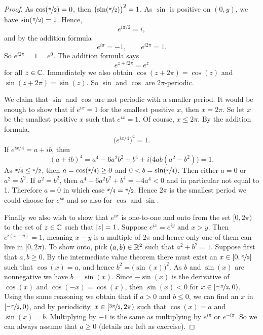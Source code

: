 \begin{proof}
As $\cos(\nicefrac{\pi}{2}) = 0$, then
${\bigl(\sin(\nicefrac{\pi}{2})\bigr)}^2 = 1$.
As $\sin$ is positive on $(0,y)$, we have
$\sin(\nicefrac{\pi}{2}) = 1$.
Hence,
\begin{equation*}
e^{i \pi /2} = i ,
\end{equation*}
and by the addition formula 
\begin{equation*}
e^{i \pi} = -1 ,
\qquad 
e^{i 2\pi} = 1 .
\end{equation*}
So $e^{i2\pi} = 1 = e^0$.  The addition formula says
\begin{equation*}
e^{z+i2\pi} = e^z
\end{equation*}
for all $z \in {\mathbb{C}}$.  Immediately we also obtain
$\cos(z+2\pi) = \cos(z)$ and $\sin(z+2\pi) = \sin(z)$.
So $\sin$ and $\cos$ are $2\pi$-periodic.

We claim that $\sin$ and $\cos$ are not periodic with a smaller period.  It
would be enough to show that if $e^{ix} = 1$ for the
smallest positive $x$, then
$x = 2\pi$.  So let $x$ be the smallest positive $x$ such that
$e^{ix} = 1$.
Of course, $x \leq 2\pi$.
By the addition formula,
\begin{equation*}
{\bigl(e^{ix/4}\bigr)}^4 = 1 .
\end{equation*}
If $e^{ix/4} = a+ib$, then
\begin{equation*}
{(a+ib)}^4
=a^4-6a^2b^2+b^4 + i\bigl(4ab(a^2-b^2)\bigr)
=1 .
\end{equation*}
As $\nicefrac{x}{4} \leq \nicefrac{\pi}{2}$, then $a = \cos(\nicefrac{x}{4}) \geq 0$ and
$0 < b = \sin(\nicefrac{x}{4})$.  Then either $a = 0$ 
or $a^2 = b^2$.  If $a^2=b^2$, then
$a^4-6a^2b^2+b^4 = -4a^4 < 0$ and in particular not equal to 1.
Therefore $a=0$ in which case $\nicefrac{x}{4} = \nicefrac{\pi}{2}$.
Hence $2\pi$ is the smallest period we could choose for $e^{ix}$
and so also for $\cos$ and $\sin$.

Finally we also wish to show that $e^{ix}$ is one-to-one and onto
from the set $[0,2\pi)$ to the set of $z \in {\mathbb{C}}$ such that
$\lvert {z} \rvert = 1$.  Suppose $e^{ix} = e^{iy}$ and 
$x > y$.  Then
$e^{i(x-y)} = 1$, meaning $x-y$ is a multiple of $2\pi$ and hence
only one of them can live in $[0,2\pi)$.
To show onto, pick $(a,b) \in {\mathbb{R}}^2$ such that $a^2+b^2 = 1$.
Suppose first that $a,b \geq 0$.  By the intermediate value theorem
there must exist an $x \in [0,\nicefrac{\pi}{2}]$ such that
$\cos(x) = a$, and hence $b^2 = \bigl(\sin(x)\bigr)^2$.  As
$b$ and $\sin(x)$ are nonnegative we have $b = \sin(x)$.
Since $-\sin(x)$ is the derivative of $\cos(x)$
and $\cos(-x) = \cos(x)$, then $\sin(x) < 0$ for $x \in [\nicefrac{-\pi}{2},0)$.
Using the same reasoning we obtain that
if $a > 0$ and $b \leq 0$, we can find an $x$ in $[\nicefrac{-\pi}{2},0)$,
and by periodicity,
$x \in [\nicefrac{3\pi}{2},2\pi)$ such that $\cos(x) = a$ and $\sin(x)=b$.
Multiplying by $-1$ is the same as multiplying by $e^{i\pi}$ or
$e^{-i\pi}$.  So we can always assume that $a \geq 0$ (details are left
as exercise).
\end{proof}

